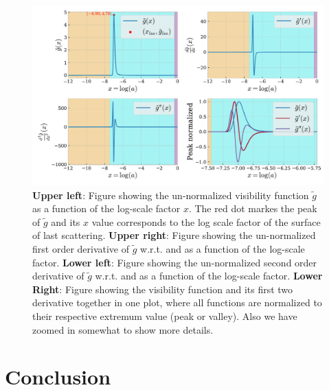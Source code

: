 \documentclass[twocolumn]{aastex62}
\begin{document}
\begin{figure}
    \includegraphics[scale = 0.65]{Figures/g_tilde.pdf}
    \caption{\textbf{Upper left}: Figure showing the un-normalized visibility function $\tilde{g}$ as a function of the log-scale factor $x$.
    The red dot markes the peak of $\tilde{g}$ 
    and its $x$ value corresponds to the log scale factor of the surface of last scattering. 
    \textbf{Upper right}: Figure showing the un-normalized first order derivative of $\tilde{g}$ w.r.t. and as a function of the log-scale factor. 
    \textbf{Lower left}: Figure showing the un-normalized second order derivative of $\tilde{g}$ w.r.t. and as a function of the log-scale factor.
    \textbf{Lower Right}: Figure showing the visibility function and its first two derivative together in one plot, where all functions are normalized to their respective extremum value (peak or valley). Also we have zoomed in somewhat to show more details.
    }
    \label{fig:g_tilde}
\end{figure}

\section{Conclusion} \label{sec:Conclusion}




\end{document}
